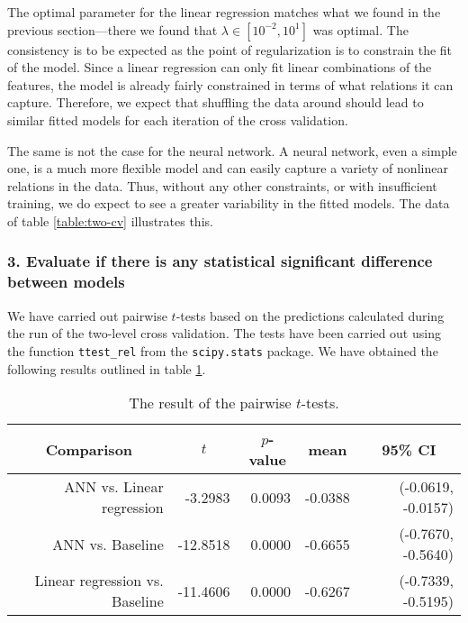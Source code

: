 The optimal parameter for the linear regression matches what we found
in the previous section—there we found that \(\lambda \in [10^{-2}, 10^1]\)
was optimal. The consistency is to be expected as the point of regularization
is to constrain the fit of the model. Since a linear regression can
only fit linear combinations of the features, the model is already fairly
constrained in terms of what relations it can capture. Therefore, we
expect that shuffling the data around should lead to similar fitted models
for each iteration of the cross validation.

The same is not the case for the neural network. A neural network, even a
simple one, is a much more flexible model and can easily capture a variety
of nonlinear relations in the data. Thus, without any other constraints,
or with insufficient training, we do expect to see a greater variability
in the fitted models. The data of table \ref{table:two-cv} illustrates this.

\subsubsection*{3. Evaluate if there is any statistical significant difference between models}

We have carried out pairwise \(t\)-tests based on the predictions
calculated during the run of the two-level cross validation. The tests
have been carried out using the function \texttt{ttest\_rel} from the
\texttt{scipy.stats} package. We have obtained the following results outlined
in table \ref{table:t-tests}.

\begin{table}[h]
	\centering
	\begin{tabular}{r r r r r}
		\hline
		\multicolumn{1}{c}{Comparison} & \multicolumn{1}{c}{\(t\)}
		& \multicolumn{1}{c}{\(p\)-value} & \multicolumn{1}{c}{mean}
		& \multicolumn{1}{c}{95\% CI}\\
		\hline
		     ANN vs. Linear regression &  -3.2983 & 0.0093 & -0.0388 & (-0.0619, -0.0157)\\
		              ANN vs. Baseline & -12.8518 & 0.0000 & -0.6655 & (-0.7670, -0.5640)\\
		Linear regression vs. Baseline & -11.4606 & 0.0000 & -0.6267 & (-0.7339, -0.5195)\\
		\hline
	\end{tabular}
	\caption{The result of the pairwise \(t\)-tests.}
	\label{table:t-tests}
\end{table}

